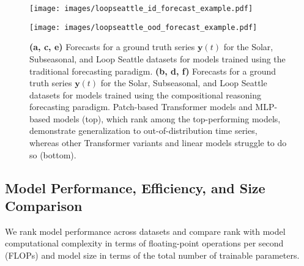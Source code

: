 \begin{figure*}[ht!]
    \begin{minipage}{0.411\textwidth}
        \centering
        \texttt{[image: images/loopseattle\_id\_forecast\_example.pdf]}
        \label{fig:loopseattle_id_forecast_example}
    \end{minipage}
    \hfill
    \begin{minipage}{0.584\textwidth}
        \centering
        \texttt{[image: images/loopseattle\_ood\_forecast\_example.pdf]}
        \label{fig:loopseattle_ood_forecast_example.pdf}
    \end{minipage}

    \caption{\textbf{(a, c, e)} Forecasts for a ground truth series $\mathbf{y}(t)$ for the Solar, Subseasonal, and Loop Seattle datasets for models trained using the traditional forecasting paradigm. \textbf{(b, d, f)} Forecasts for a ground truth series $\mathbf{y}(t)$ for the Solar, Subseasonal, and Loop Seattle datasets for models trained using the compositional reasoning forecasting paradigm. Patch-based Transformer models and MLP-based models (top), which rank among the top-performing models, demonstrate generalization to out-of-distribution time series, whereas other Transformer variants and linear models struggle to do so (bottom).}
    \label{fig:forecast_examples2_apd}
\end{figure*}


\newpage
\subsection{Model Performance, Efficiency, and Size Comparison}\label{apd:flops_plots}
We rank model performance across datasets and compare rank with model computational complexity in terms of floating-point operations per second (FLOPs) and model size in terms of the total number of trainable parameters. 

